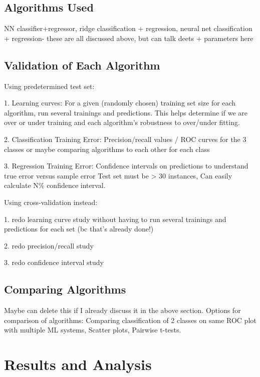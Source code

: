 \documentclass{anstrans}
\begin{document}
\subsection{Algorithms Used}

NN classifier+regressor, ridge classification + regression, neural net
classification + regression- these are all discussed above, but can talk deets
+ parameters here

\subsection{Validation of Each Algorithm}

Using predetermined test set:

1. Learning curves: For a given (randomly chosen) training set size for each
algorithm, run several trainings and predictions. This helps determine if we
are over or under training and each algorithm's robustness to over/under
fitting.  

2. Classification Training Error: Precision/recall values / ROC curves for the
3 classes or maybe comparing algorithms to each other for each class

3. Regression Training Error: Confidence intervals on predictions to understand
true error versus sample error Test set must be > 30 instances, Can easily
calculate N\% confidence interval.

Using cross-validation instead:

1. redo learning curve study without having to run several trainings and
predictions for each set (bc that's already done!)

2. redo precision/recall study 

3. redo confidence interval study


\subsection{Comparing Algorithms}

Maybe can delete this if I already discuss it in the above section. Options for
comparison of algorithms: Comparing classification of 2 classes on same ROC
plot with multiple ML systems, Scatter plots, Pairwise t-tests. 

\section{Results and Analysis}
\end{document}

